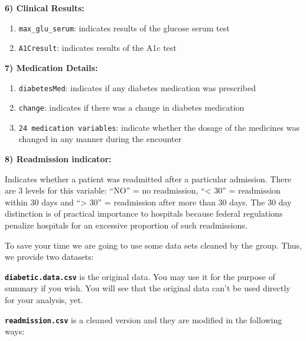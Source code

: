 \documentclass[
]{article}
\providecommand{\tightlist}{%
  \setlength{\itemsep}{0pt}\setlength{\parskip}{0pt}}
\begin{document}
\textbf{6) Clinical Results:}

\begin{enumerate}
\def\labelenumi{\alph{enumi}.}
\tightlist
\item
  \texttt{max\_glu\_serum}: indicates results of the glucose serum test
\item
  \texttt{A1Cresult}: indicates results of the A1c test
\end{enumerate}

\textbf{7) Medication Details:}

\begin{enumerate}
\def\labelenumi{\alph{enumi}.}
\tightlist
\item
  \texttt{diabetesMed}: indicates if any diabetes medication was
  prescribed
\item
  \texttt{change}: indicates if there was a change in diabetes
  medication
\item
  \texttt{24\ medication\ variables}: indicate whether the dosage of the
  medicines was changed in any manner during the encounter
\end{enumerate}

\textbf{8) Readmission indicator:}

Indicates whether a patient was readmitted after a particular admission.
There are 3 levels for this variable: ``NO'' = no readmission,
``\textless{} 30'' = readmission within 30 days and ``\textgreater{}
30'' = readmission after more than 30 days. The 30 day distinction is of
practical importance to hospitals because federal regulations penalize
hospitals for an excessive proportion of such readmissions.

To save your time we are going to use some data sets cleaned by the
group. Thus, we provide two datasets:

\textbf{\texttt{diabetic.data.csv}} is the original data. You may use it
for the purpose of summary if you wish. You will see that the original
data can't be used directly for your analysis, yet.

\textbf{\texttt{readmission.csv}} is a cleaned version and they are
modified in the following ways:
\end{document}
